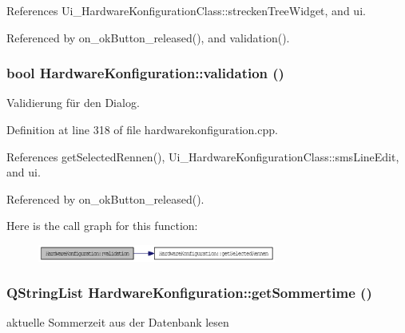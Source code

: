 References Ui\_\-HardwareKonfigurationClass::streckenTreeWidget, and ui.

Referenced by on\_\-okButton\_\-released(), and validation().\hypertarget{class_hardware_konfiguration_322f69fe2384198fd83509ae35353f75}{
\subsubsection[validation]{\setlength{\rightskip}{0pt plus 5cm}bool HardwareKonfiguration::validation ()}}
\label{class_hardware_konfiguration_322f69fe2384198fd83509ae35353f75}


Validierung für den Dialog. 



Definition at line 318 of file hardwarekonfiguration.cpp.

References getSelectedRennen(), Ui\_\-HardwareKonfigurationClass::smsLineEdit, and ui.

Referenced by on\_\-okButton\_\-released().

Here is the call graph for this function:\nopagebreak
\begin{figure}[H]
\begin{center}
\leavevmode
\includegraphics[width=222pt]{class_hardware_konfiguration_322f69fe2384198fd83509ae35353f75_cgraph}
\end{center}
\end{figure}
\hypertarget{class_hardware_konfiguration_26b0567a1972d8bb30dd3065cfc03b17}{
\subsubsection[getSommertime]{\setlength{\rightskip}{0pt plus 5cm}QStringList HardwareKonfiguration::getSommertime ()}}
\label{class_hardware_konfiguration_26b0567a1972d8bb30dd3065cfc03b17}


aktuelle Sommerzeit aus der Datenbank lesen 



